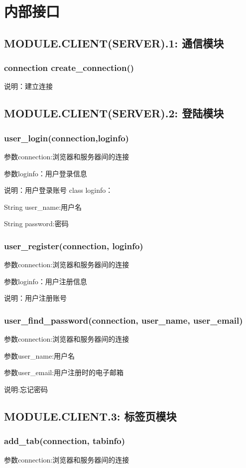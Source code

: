 \section{内部接口}

\subsection{MODULE.CLIENT(SERVER).1: 通信模块}

\subsubsection{connection create\_connection()}
说明：建立连接

\subsection{MODULE.CLIENT(SERVER).2: 登陆模块}

\subsubsection{user\_login(connection,loginfo)}
参数connection:浏览器和服务器间的连接

参数loginfo：用户登录信息

说明：用户登录账号
class loginfo：

String user\_name:用户名

String password:密码
\subsubsection{user\_register(connection, loginfo)}
参数connection:浏览器和服务器间的连接

参数loginfo：用户注册信息

说明：用户注册账号
\subsubsection{user\_find\_password(connection, user\_name, user\_email)}
参数connection:浏览器和服务器间的连接

参数user\_name:用户名

参数user\_email:用户注册时的电子邮箱

说明:忘记密码
\subsection{MODULE.CLIENT.3: 标签页模块}

\subsubsection{add\_tab(connection, tabinfo)}
参数connection:浏览器和服务器间的连接

